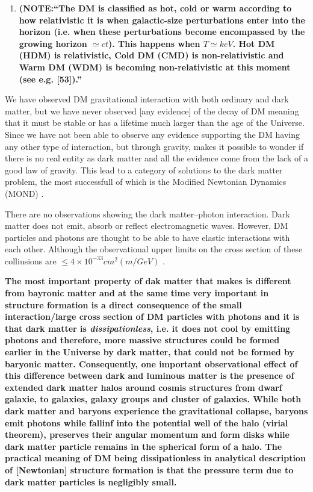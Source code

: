 \documentclass[paper=a4, fontsize=11pt]{scrartcl} %
\numberwithin{equation}{section} %
\numberwithin{figure}{section} %
\numberwithin{table}{section} %
\begin{document}
\begin{enumerate}
  \item {\bf (NOTE:``The DM is classified as hot, cold or warm according to how relativistic it is when galactic-size perturbations enter into the horizon (i.e. when these perturbations become encompassed by the growing horizon $\simeq ct$). This happens when $T \simeq keV$. Hot DM (HDM) is relativistic, Cold DM (CMD) is non-relativistic and Warm DM (WDM) is becoming non-relativistic at this moment (see e.g. [53]).''}
  \end{enumerate}
  
We have observed DM gravitational interaction with both ordinary and dark matter, but we have never observed [any evidence] of the decay of DM meaning that it must be stable or has a lifetime much larger than the age of the Universe. Since we have not been able to observe any evidence supporting the DM having any other type of interaction, but through gravity, makes it possible to wonder if there is no real entity as dark matter and all the evidence come from the lack of a good law of gravity. This lead to a category of solutions to the dark matter problem, the most successfull of which is the Modified Newtonian Dynamics (MOND) \citep[ref. 14 \& 15 in lecturenotes!][]{}.

There are no observations showing the dark matter--photon interaction. Dark matter does not emit, absorb or reflect electromagnetic waves. However, DM particles and photons are thought to be able to have elastic interactions with each other. Although the observational upper limits on the cross section of these colliusions are $\leq 4\times 10^\mathrm{-33} cm^2(m/GeV)$ \citep[ref 38 in lecture notes][]{}.

{\bf The most important property of dak matter that makes is different from bayronic matter and at the same time very important in structure formation is a direct consequence of the small interaction/large cross section of DM particles with photons and it is that dark matter is \emph{dissipationless}, i.e. it does not cool by emitting photons and therefore, more massive structures could be formed earlier in the Universe by dark matter, that could not be formed by baryonic matter. Consequently, one important observational effect of this difference between dark and luminous matter is the presence of extended dark matter halos around cosmis structures from dwarf galaxie, to galaxies, galaxy groups and cluster of galaxies. While both dark matter and baryons experience the gravitational collapse, baryons emit photons while fallinf into the potential well of the halo (virial theorem), preserves their angular momentum and form disks while dark matter particle remains in the spherical form of a halo. The practical meaning of DM being dissipationless in analytical description of [Newtonian] structure formation is that the pressure term due to dark matter particles is negligibly small.}
\end{document}
